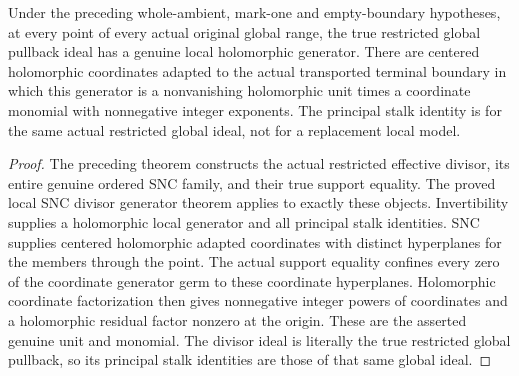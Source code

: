 \begin{theorem}
\label{hir:original-global-principalization-range-unit-monomial-generator}
\leanok
{}
Under the preceding whole-ambient, mark-one and empty-boundary hypotheses,
at every point of every actual original global range, the true restricted
global pullback ideal has a genuine local holomorphic generator.  There
are centered holomorphic coordinates adapted to the actual transported
terminal boundary in which this generator is a nonvanishing holomorphic
unit times a coordinate monomial with nonnegative integer exponents.
The principal stalk identity is for the same actual restricted global
ideal, not for a replacement local model.
\end{theorem}
\begin{proof}
The preceding theorem constructs the actual restricted effective divisor,
its entire genuine ordered SNC family, and their true support equality.
The proved local SNC divisor generator theorem applies to exactly these
objects.  Invertibility supplies a holomorphic local generator and all
principal stalk identities.  SNC supplies centered holomorphic adapted
coordinates with distinct hyperplanes for the members through the point.
The actual support equality confines every zero of the coordinate
generator germ to these coordinate hyperplanes.  Holomorphic coordinate
factorization then gives nonnegative integer powers of coordinates and
a holomorphic residual factor nonzero at the origin.  These are the
asserted genuine unit and monomial.  The divisor ideal is literally the
true restricted global pullback, so its principal stalk identities are
those of that same global ideal.
\end{proof}
